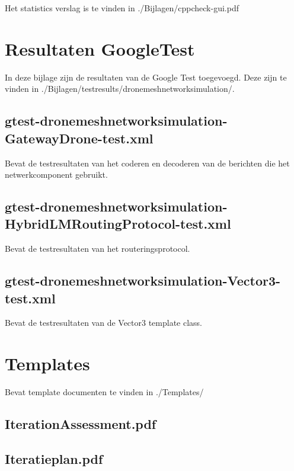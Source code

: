\documentclass[a4paper, 11pt, oneside]{report}
\begin{document}
Het statistics verslag is te vinden in ./Bijlagen/cppcheck-gui.pdf

\chapter{Resultaten GoogleTest}\label{sec:resultaten-googletest}
In deze bijlage zijn de resultaten van de Google Test toegevoegd.
Deze zijn te vinden in ./Bijlagen/test\textunderscore results/drone\textunderscore meshnetwork\textunderscore simulation/.



\section{gtest-drone\textunderscore meshnetwork\textunderscore simulation-GatewayDrone-test.xml}\label{sec:gtest-dronemeshnetworksimulation-gatewaydrone-testxml}
Bevat de testresultaten van het coderen en decoderen van de berichten die het netwerkcomponent gebruikt.

\section{gtest-drone\textunderscore meshnetwork\textunderscore simulation-HybridLMRoutingProtocol-test.xml}\label{sec:gtest-dronemeshnetworksimulation-hybridlmroutingprotocol-testxml}
Bevat de testresultaten van het routeringsprotocol.

\section{gtest-drone\textunderscore meshnetwork\textunderscore simulation-Vector3-test.xml}\label{sec:gtest-dronemeshnetworksimulation-vector3-testxml}
Bevat de testresultaten van de Vector3 template class.

\chapter{Templates}\label{app:templates}
Bevat template documenten te vinden in ./Templates/
\section{IterationAssessment.pdf}\label{app:IterationAssessment}
\section{Iteratieplan.pdf}\label{app:Iteratieplan}
\end{document}
